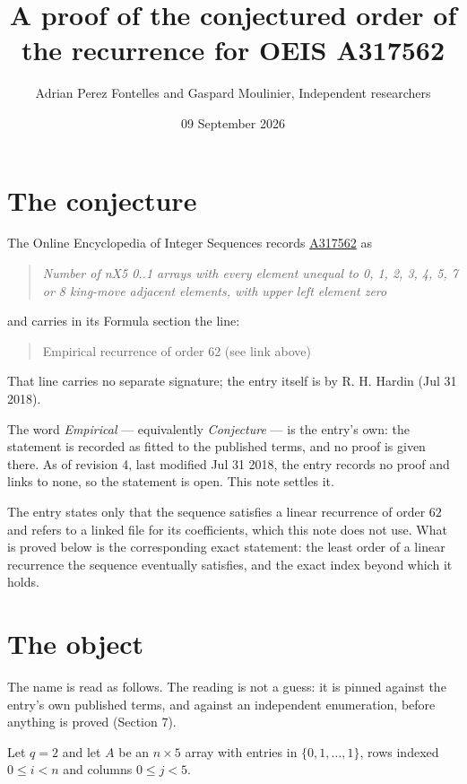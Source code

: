 \documentclass[11pt]{article}
\title{A proof of the conjectured order of the recurrence for OEIS A317562}
\author{Adrian Perez Fontelles and Gaspard Moulinier, Independent researchers}
\date{09 September 2026}
\theoremstyle{definition}
\begin{document}
\maketitle
\section{The conjecture}

The Online Encyclopedia of Integer Sequences records \href{https://oeis.org/A317562}{A317562} as

\begin{quote}\itshape Number of nX5 0..1 arrays with every element unequal to 0, 1, 2, 3, 4, 5, 7 or 8 king-move adjacent elements, with upper left element zero\end{quote}

and carries in its Formula section the line:

\begin{quote}\ttfamily Empirical recurrence of order 62 (see link above)\end{quote}

That line carries no separate signature; the entry itself is by R. H. Hardin (Jul 31 2018).

The word {\itshape Empirical} --- equivalently {\itshape Conjecture} --- is the entry's own: the statement is recorded as fitted to the published terms, and no proof is given there. As of revision 4, last modified Jul 31 2018, the entry records no proof and links to none, so the statement is open. This note settles it.

The entry states only that the sequence satisfies a linear recurrence of order $62$ and refers to a linked file for its coefficients, which this note does not use. What is proved below is the corresponding exact statement: the least order of a linear recurrence the sequence eventually satisfies, and the exact index beyond which it holds.

\section{The object}

The name is read as follows. The reading is not a guess: it is pinned against the entry's own published terms, and against an independent enumeration, before anything is proved (Section 7).

Let $q = 2$ and let $A$ be an $n \times 5$ array with entries in $\{0,1,\dots,1\}$, rows indexed $0 \le i < n$ and columns $0 \le j < 5$.
\end{document}
